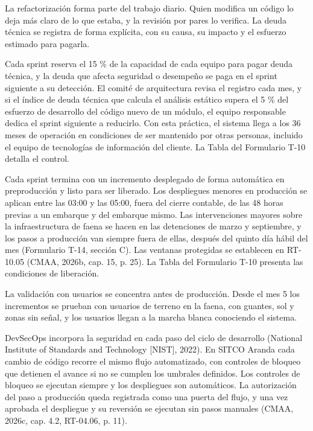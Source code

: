 \documentclass[subdoc]{../../comun/overfore}
\begin{document}
La refactorización forma parte del trabajo diario. Quien modifica un código lo deja más claro de lo que estaba, y la revisión por pares lo verifica. La deuda técnica se registra de forma explícita, con su causa, su impacto y el esfuerzo estimado para pagarla.

Cada sprint reserva el 15 \% de la capacidad de cada equipo para pagar deuda técnica, y la deuda que afecta seguridad o desempeño se paga en el sprint siguiente a su detección. El comité de arquitectura revisa el registro cada mes, y si el índice de deuda técnica que calcula el análisis estático supera el 5 \% del esfuerzo de desarrollo del código nuevo de un módulo, el equipo responsable dedica el sprint siguiente a reducirlo. Con esta práctica, el sistema llega a los 36 meses de operación en condiciones de ser mantenido por otras personas, incluido el equipo de tecnologías de información del cliente. La Tabla  del Formulario T-10 detalla el control.

Cada sprint termina con un incremento desplegado de forma automática en preproducción y listo para ser liberado. Los despliegues menores en producción se aplican entre las 03:00 y las 05:00, fuera del cierre contable, de las 48 horas previas a un embarque y del embarque mismo. Las intervenciones mayores sobre la infraestructura de faena se hacen en las detenciones de marzo y septiembre, y los pasos a producción van siempre fuera de ellas, después del quinto día hábil del mes (Formulario T-14, sección C). Las ventanas protegidas se establecen en RT-10.05 (CMAA, 2026b, cap. 15, p. 25). La Tabla  del Formulario T-10 presenta las condiciones de liberación.

La validación con usuarios se concentra antes de producción. Desde el mes 5 los incrementos se prueban con usuarios de terreno en la faena, con guantes, sol y zonas sin señal, y los usuarios llegan a la marcha blanca conociendo el sistema.

DevSecOps incorpora la seguridad en cada paso del ciclo de desarrollo (National Institute of Standards and Technology [NIST], 2022). En SITCO Aranda cada cambio de código recorre el mismo flujo automatizado, con controles de bloqueo que detienen el avance si no se cumplen los umbrales definidos. Los controles de bloqueo se ejecutan siempre y los despliegues son automáticos. La autorización del paso a producción queda registrada como una puerta del flujo, y una vez aprobada el despliegue y su reversión se ejecutan sin pasos manuales (CMAA, 2026c, cap. 4.2, RT-04.06, p. 11).
\end{document}
